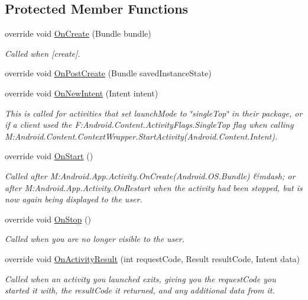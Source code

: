 \subsection*{Protected Member Functions}
\begin{DoxyCompactItemize}
\item 
override void \hyperlink{class_w_c_c_mobile_1_1_campus_map_activity_aeb984dffcd2273acbfa613b77463ab41}{On\+Create} (Bundle bundle)
\begin{DoxyCompactList}\small\item\em Called when \mbox{[}create\mbox{]}. \end{DoxyCompactList}\item 
override void \hyperlink{class_w_c_c_mobile_1_1_campus_map_activity_a1af9a9440cd61b261be8493a7fad7d3c}{On\+Post\+Create} (Bundle saved\+Instance\+State)
\item 
override void \hyperlink{class_w_c_c_mobile_1_1_campus_map_activity_a2c2b911fee48f83a49b5924ab94b74db}{On\+New\+Intent} (Intent intent)
\begin{DoxyCompactList}\small\item\em This is called for activities that set launch\+Mode to \char`\"{}single\+Top\char`\"{} in their package, or if a client used the {\ttfamily F\+:\+Android.\+Content.\+Activity\+Flags.\+Single\+Top} flag when calling {\ttfamily M\+:\+Android.\+Content.\+Context\+Wrapper.\+Start\+Activity(\+Android.\+Content.\+Intent)}. \end{DoxyCompactList}\item 
override void \hyperlink{class_w_c_c_mobile_1_1_campus_map_activity_a4bdab2012ca79f06da02249206fe0a72}{On\+Start} ()
\begin{DoxyCompactList}\small\item\em Called after {\ttfamily M\+:\+Android.\+App.\+Activity.\+On\+Create(\+Android.\+O\+S.\+Bundle)} \&mdash; or after {\ttfamily M\+:\+Android.\+App.\+Activity.\+On\+Restart} when the activity had been stopped, but is now again being displayed to the user. \end{DoxyCompactList}\item 
override void \hyperlink{class_w_c_c_mobile_1_1_campus_map_activity_a2e6f92363f8a8ca49caa2962f96c2538}{On\+Stop} ()
\begin{DoxyCompactList}\small\item\em Called when you are no longer visible to the user. \end{DoxyCompactList}\item 
override void \hyperlink{class_w_c_c_mobile_1_1_campus_map_activity_a91db75c589386bb46f2e356c8c8b6623}{On\+Activity\+Result} (int request\+Code, Result result\+Code, Intent data)
\begin{DoxyCompactList}\small\item\em Called when an activity you launched exits, giving you the request\+Code you started it with, the result\+Code it returned, and any additional data from it. \end{DoxyCompactList}\end{DoxyCompactItemize}
